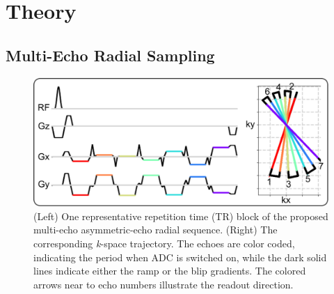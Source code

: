 \documentclass[journal,twoside,web]{ieeecolor}
\begin{document}




\section{Theory}

\subsection{Multi-Echo Radial Sampling}

\begin{figure}
	\centering
	\includegraphics[width=\columnwidth]{../../figures/tan1.pdf}
	\caption{(Left) One representative repetition time (TR) block of 
		the proposed multi-echo asymmetric-echo radial sequence. 
		(Right) The corresponding \textit{k}-space trajectory. 
		The echoes are color coded, indicating the period when ADC is switched on, 
		while the dark solid lines indicate either the ramp or the blip gradients. 
		The colored arrows near to echo numbers illustrate the readout direction.}
	\label{FIG:SEQ}
\end{figure}
\end{document}
